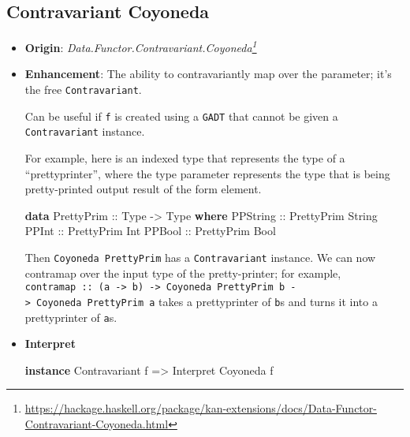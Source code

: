 \documentclass[]{article}
\newenvironment{Shaded}{}{}
\newcommand{\DataTypeTok}[1]{\textcolor[rgb]{0.56,0.13,0.00}{#1}}
\newcommand{\KeywordTok}[1]{\textcolor[rgb]{0.00,0.44,0.13}{\textbf{#1}}}
\newcommand{\NormalTok}[1]{#1}
\newcommand{\OtherTok}[1]{\textcolor[rgb]{0.00,0.44,0.13}{#1}}
\renewcommand{\href}[2]{#2\footnote{\url{#1}}}
\begin{document}
\hypertarget{contravariant-coyoneda}{%
\subsection{Contravariant Coyoneda}\label{contravariant-coyoneda}}

\begin{itemize}
\item
  \textbf{Origin}:
  \emph{\href{https://hackage.haskell.org/package/kan-extensions/docs/Data-Functor-Contravariant-Coyoneda.html}{Data.Functor.Contravariant.Coyoneda}}
\item
  \textbf{Enhancement}: The ability to contravariantly map over the parameter;
  it's the free \texttt{Contravariant}.

  Can be useful if \texttt{f} is created using a \texttt{GADT} that cannot be
  given a \texttt{Contravariant} instance.

  For example, here is an indexed type that represents the type of a
  ``prettyprinter'', where the type parameter represents the type that is being
  pretty-printed output result of the form element.

\begin{Shaded}
\begin{Highlighting}[]
\KeywordTok{data} \DataTypeTok{PrettyPrim}\OtherTok{ ::} \DataTypeTok{Type} \OtherTok{{-}>} \DataTypeTok{Type} \KeywordTok{where}
    \DataTypeTok{PPString}\OtherTok{  ::} \DataTypeTok{PrettyPrim} \DataTypeTok{String}
    \DataTypeTok{PPInt}\OtherTok{     ::} \DataTypeTok{PrettyPrim} \DataTypeTok{Int}
    \DataTypeTok{PPBool}\OtherTok{    ::} \DataTypeTok{PrettyPrim} \DataTypeTok{Bool}
\end{Highlighting}
\end{Shaded}

  Then \texttt{Coyoneda\ PrettyPrim} has a \texttt{Contravariant} instance. We
  can now contramap over the input type of the pretty-printer; for example,
  \texttt{contramap\ ::\ (a\ -\textgreater{}\ b)\ -\textgreater{}\ Coyoneda\ PrettyPrim\ b\ -\textgreater{}\ Coyoneda\ PrettyPrim\ a}
  takes a prettyprinter of \texttt{b}s and turns it into a prettyprinter of
  \texttt{a}s.
\item
  \textbf{Interpret}

\begin{Shaded}
\begin{Highlighting}[]
\KeywordTok{instance} \DataTypeTok{Contravariant}\NormalTok{ f }\OtherTok{=>} \DataTypeTok{Interpret} \DataTypeTok{Coyoneda}\NormalTok{ f}


\end{Highlighting}
\end{Shaded}
\end{itemize}
\end{document}
